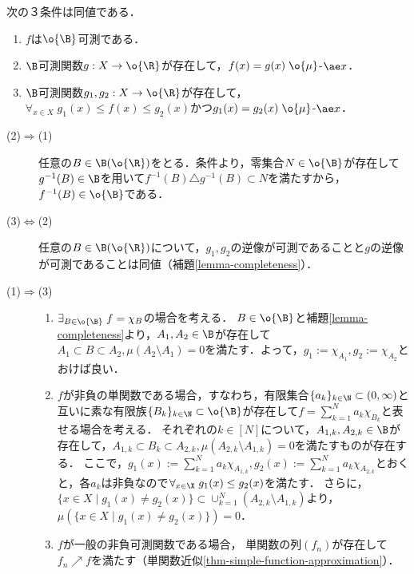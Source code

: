 \documentclass[uplatex, dvipdfmx]{jsreport}
\begin{document}
\begin{proposition}[完備化可測性の特徴付け]\label{prop-characterization-of-measurability-on-complete-space}
    次の３条件は同値である．
    \begin{enumerate}
        \item $f$は$\o{\B}$可測である．
        \item $\B$可測関数$g:X\to\o{\R}$が存在して，$f(x)=g(x)\;\o{\mu}$-$\ae x$．
        \item $\B$可測関数$g_1,g_2:X\to\o{\R}$が存在して，$\forall_{x\in X}\;g_1(x)\le f(x)\le g_2(x)$かつ$g_1(x)=g_2(x)\;\o{\mu}$-$\ae x$．
    \end{enumerate}
\end{proposition}
\begin{Proof}\mbox{}
    \begin{description}
        \item[(2)$\Rightarrow$(1)] 任意の$B\in\B(\o{\R})$をとる．条件より，零集合$N\in\o{\B}$が存在して$g^{-1}(B)\in\B$を用いて$f^{-1}(B)\triangle g^{-1}(B)\subset N$を満たすから，$f^{-1}(B)\in\o{\B}$である．
        \item[(3)$\Leftrightarrow$(2)] 任意の$B\in\B(\o{\R})$について，$g_1,g_2$の逆像が可測であることと$g$の逆像が可測であることは同値（補題\ref{lemma-completeness}）．
        \item[(1)$\Rightarrow$(3)] \begin{enumerate}
            \item $\exists_{B\in\o{\B}}\;f=\chi_B$の場合を考える．
            $B\in\o{\B}$と補題\ref{lemma-completeness}より，$A_1,A_2\in\B$が存在して$A_1\subset B\subset A_2,\mu(A_2\setminus A_1)=0$を満たす．よって，$g_1:=\chi_{A_1},g_2:=\chi_{A_2}$とおけば良い．
            \item $f$が非負の単関数である場合，すなわち，有限集合$\{a_k\}_{k\in\N}\subset(0,\infty)$と互いに素な有限族$\{B_k\}_{k\in\N}\subset\o{\B}$が存在して$f=\sum^N_{k=1}a_k\chi_{B_k}$と表せる場合を考える．
            それぞれの$k\in[N]$について，$A_{1,k},A_{2,k}\in\B$が存在して，$A_{1,k}\subset B_k\subset A_{2,k},\mu(A_{2,k}\setminus A_{1,k})=0$を満たすものが存在する．
            ここで，$g_1(x):=\sum^N_{k=1}a_k\chi_{A_{1,k}},g_2(x):=\sum^N_{k=1}a_k\chi_{A_{2,k}}$とおくと，各$a_k$は非負なので$\forall_{x\in\X}\;g_1(x)\le g_2(x)$を満たす．
            さらに，$\{x\in X\mid g_1(x)\ne g_2(x)\}\subset\cup^N_{k=1}(A_{2,k}\setminus A_{1,k})$より，$\mu(\{x\in X\mid g_1(x)\ne g_2(x)\})=0$．
            \item $f$が一般の非負可測関数である場合，
            単関数の列$(f_n)$が存在して$f_n\nearrow f$を満たす（単関数近似\ref{thm-simple-function-approximation}）．

\end{enumerate}
\end{description}
\end{Proof}
\end{document}
